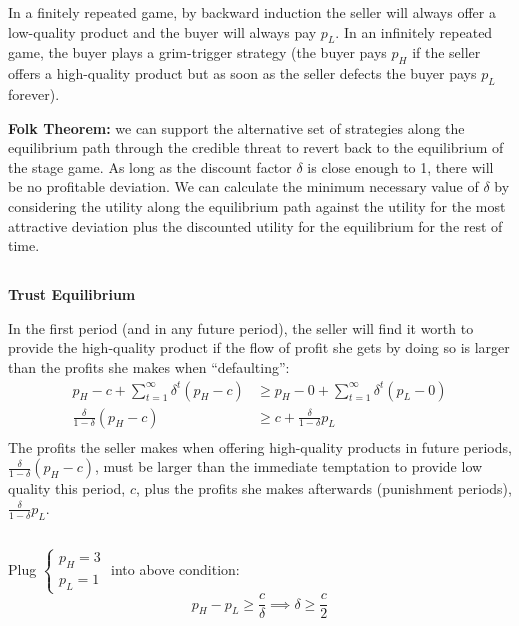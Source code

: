 \documentclass[a4paper, 11pt]{article}
\begin{document}
In a finitely repeated game, by backward induction the seller will always offer a low-quality product and the buyer will always pay $p_L$. In an infinitely repeated game, the buyer plays a grim-trigger strategy (the buyer pays $p_H$ if the seller offers a high-quality product but as soon as the seller defects the buyer pays $p_L$ forever).

\textbf{Folk Theorem:} we can support the alternative set of strategies along the equilibrium path through the credible threat to revert back to the equilibrium of the stage game. As long as the discount factor $\delta$ is close enough to 1, there will be no profitable deviation. We can calculate the minimum necessary value of $\delta$ by considering the utility along the equilibrium path against the utility for the most attractive deviation plus the discounted utility for the equilibrium for the rest of time.


\subsection{} %

\textbf{Trust Equilibrium}

In the first period (and in any future period), the seller will find it worth to provide the high-quality product if the flow of profit she gets by doing so is larger than the profits she makes when ``defaulting'':
\begin{align*}
    p_H - c + \sum_{t=1}^{\infty}\delta^{t}(p_H - c) &\geq p_H - 0 + \sum_{t=1}^{\infty}\delta^{t}(p_L - 0) \\
    \frac{\delta}{1-\delta} (p_H - c) &\geq c + \frac{\delta}{1-\delta}p_L \\
\end{align*}
The profits the seller makes when offering high-quality products in future periods, $\frac{\delta}{1-\delta} (p_H - c)$, must be larger than the immediate temptation to provide low quality this period, $c$, plus the profits she makes afterwards (punishment periods), $\frac{\delta}{1-\delta}p_L$.

\subsection{} %

Plug $\begin{cases}p_H=3 \\ p_L=1 \end{cases}$ into above condition:
\[p_H - p_L \geq \frac{c}{\delta} \implies \delta\geq\frac{c}{2} \]
\end{document}
